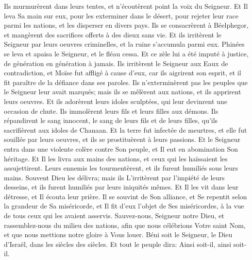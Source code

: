 {\VERSE Ils murmurèrent dans leurs tentes, et n'écoutèrent point la voix du Seigneur. \EVERSE
\VERSE Et Il leva Sa main sur eux, pour les exterminer dans le désert, \EVERSE
\VERSE pour rejeter leur race parmi les nations, et les disperser en divers pays. \EVERSE
\VERSE Ils se consacrèrent à Béelphegor, et mangèrent des sacrifices offerts à des dieux sans vie. \EVERSE
\VERSE Et ils irritèrent le Seigneur par leurs oeuvres criminelles, et la ruine s'accumula parmi eux. \EVERSE
\VERSE Phinées se leva et apaisa le Seigneur, et le fléau cessa. \EVERSE
\VERSE Et ce zèle lui a été imputé à justice, de génération en génération à jamais. \EVERSE
\VERSE Ils irritèrent le Seigneur aux Eaux de contradiction, et Moïse fut affligé à cause d'eux, \EVERSE
\VERSE car ils aigrirent son esprit, et il fit paraître de la défiance dans ses paroles.  \EVERSE
\VERSE Ils n'exterminèrent pas les peuples que le Seigneur leur avait marqués; \EVERSE
\VERSE mais ils se mêlèrent aux nations, et ils apprirent leurs oeuvres. \EVERSE
\VERSE Et ils adorèrent leurs idoles sculptées, qui leur devinrent une occasion de chute. \EVERSE
\VERSE Ils immolèrent leurs fils et leurs filles aux démons. \EVERSE
\VERSE Ils répandirent le sang innocent, le sang de leurs fils et de leurs filles, qu'ils sacrifièrent aux idoles de Chanaan. \EVERSE
\VERSE Et la terre fut infectée de meurtres, \EVERSE
\VERSE et elle fut souillée par leurs oeuvres, et ils se prostituèrent à leurs passions. \EVERSE
\VERSE Et le Seigneur entra dans une violente colère contre Son peuple, et Il eut en abomination Son héritage. \EVERSE
\VERSE Et Il les livra aux mains des nations, et ceux qui les haïssaient les assujettirent. \EVERSE
\VERSE Leurs ennemis les tourmentèrent, et ils furent humiliés sous leurs mains. \EVERSE
\VERSE Souvent Dieu les délivra; mais ils L'irritèrent par l'impiété de leurs desseins, et ils furent humiliés par leurs iniquités mêmes. \EVERSE
\VERSE Et Il les vit dans leur détresse, et Il écouta leur prière. \EVERSE
\VERSE Il se souvint de Son alliance, et Se repentit selon la grandeur de Sa miséricorde, \EVERSE
\VERSE et Il fit d'eux l'objet de Ses miséricordes, à la vue de tous ceux qui les avaient asservis. \EVERSE
\VERSE Sauvez-nous, Seigneur notre Dieu, et rassemblez-nous du milieu des nations, afin que nous célébrions Votre saint Nom, et que nous mettions notre gloire à Vous louer. \EVERSE
\VERSE Béni soit le Seigneur, le Dieu d'Israël, dans les siècles des siècles. Et tout le peuple dira: Ainsi soit-il, ainsi soit-il.

}
